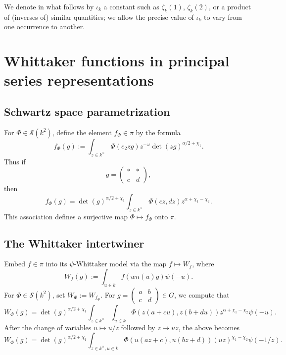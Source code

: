 \documentclass[reqno]{amsart} 
\begin{document}
We denote in what follows by $\iota_k$ a constant such as $\zeta_k(1)$, $\zeta_k(2)$, or a product of (inverses of) similar quantities; we allow the precise value of $\iota_k$ to vary from one occurrence to another.

\section{Whittaker functions in principal series representations}
\label{sec:orgd52af82}
\subsection{Schwartz space parametrization}
\label{sec:orgd34bf57}
For \(\Phi \in \mathcal{S}(k^2)\), define the element \(f_\Phi \in \pi\) by the formula
\begin{equation*}
  f_\Phi(g) := \int_{z \in k^\times} \Phi(e_2 z g) z^{-\omega} \det(z g)^{\alpha/2+\chi_1}.
\end{equation*}
Thus if
\begin{equation*}
  g =
  \begin{pmatrix}
    \ast & \ast \\
    c & d
  \end{pmatrix}
  ,
\end{equation*}
then
\begin{equation*}
  f_\Phi(g) = \det(g)^{\alpha/2+\chi_1} \int_{z \in k^\times} \Phi(c z, d z) z^{\alpha+\chi_1-\chi_2}.
\end{equation*}
This association defines a surjective map \(\Phi \mapsto f_\Phi\) onto \(\pi\).

\subsection{The Whittaker intertwiner}
\label{sec:org908ce5e}
Embed \(f \in \pi\) into its \(\psi\)-Whittaker model via the map \(f \mapsto W_f\), where
\begin{equation*}
  W_f(g) := \int_{u \in k} f(w n(u) g) \psi(-u).
\end{equation*}
For \(\Phi \in \mathcal{S}(k^2)\), set \(W_{\Phi} := W_{f_{\Phi}}\).  For $g = \left(
  \begin{smallmatrix}
    a&b\\
    c&d
  \end{smallmatrix}
\right) \in G$, we compute that
\begin{equation*}
  W_\Phi(g) = \det(g)^{\alpha/2+\chi_1} \int_{z \in k^\times} \int _{u \in k} \Phi (z (a + c u), z (b + d u)) z^{\alpha+\chi_1-\chi_2} \psi(- u).
\end{equation*}
After the change of variables \(u \mapsto u/z\) followed by \(z \mapsto u z\), the above becomes
\begin{equation}\label{whit-general}
  W_\Phi(g)
  =
  \det(g)^{\alpha/2+\chi_1}
  \int_{z \in k^\times, u \in k}
  \Phi (u(a z + c), u(b z + d))
  (u z)^{\chi_1-\chi_2}
  \psi(- 1/z).
\end{equation}
\end{document}
